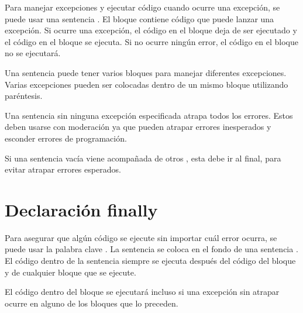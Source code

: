 Para manejar excepciones y ejecutar código cuando ocurre una excepción, se puede usar una sentencia . El bloque  contiene código que puede lanzar una excepción. Si ocurre una excepción, el código en el bloque  deja de ser ejecutado y el código en el bloque  se ejecuta. Si no ocurre ningún error, el código en el bloque  no se ejecutará.


Una sentencia  puede tener varios bloques  para manejar diferentes excepciones. Varias excepciones pueden ser colocadas dentro de un mismo bloque  utilizando paréntesis.


Una sentencia  sin ninguna excepción especificada atrapa todos los errores. Estos deben usarse con moderación ya que pueden atrapar errores inesperados y esconder errores de programación.


Si una sentencia  vacía viene acompañada de otros , esta debe ir al final, para evitar atrapar errores esperados.


\section{Declaración finally}

Para asegurar que algún código se ejecute sin importar cuál error ocurra, se puede usar la palabra clave . La sentencia  se coloca en el fondo de una sentencia . El código dentro de la sentencia  siempre se ejecuta después del código del bloque  y de cualquier bloque  que se ejecute.


El código dentro del bloque  se ejecutará incluso si una excepción sin atrapar ocurre en alguno de los bloques que lo preceden.

